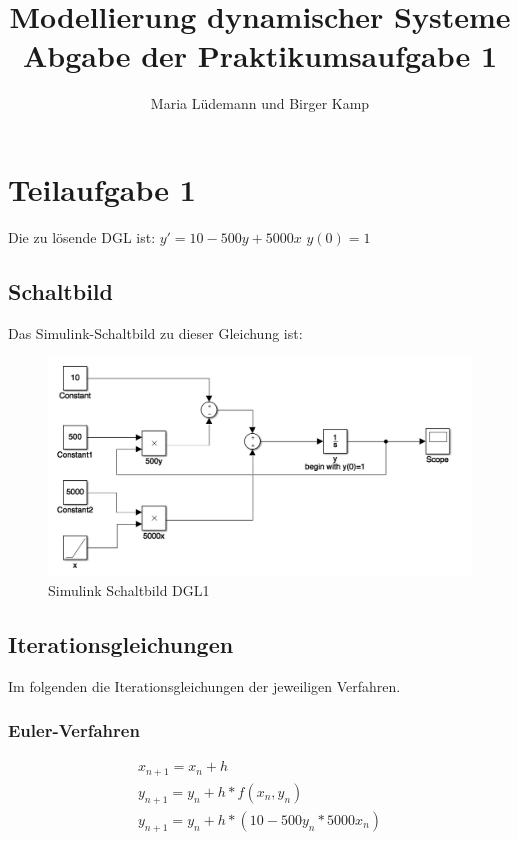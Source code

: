 \documentclass[]{scrartcl}
\title{Modellierung dynamischer Systeme  \\ Abgabe der Praktikumsaufgabe 1}
\author{Maria Lüdemann und Birger Kamp}
\begin{document}
\maketitle

\begin{abstract}

\end{abstract}

\section*{Teilaufgabe 1}
Die zu lösende DGL ist:
$ y' = 10 - 500y + 5000x $
$ y(0) = 1 $

\subsection*{Schaltbild}
Das Simulink-Schaltbild zu dieser Gleichung ist:

\begin{figure}[htbp]
\centering
\includegraphics[width=0.7\linewidth]{A1_1_Schaltbild}
\caption{Simulink Schaltbild DGL1}
\label{fig:A1_1_Schaltbild}
\end{figure}

\subsection*{Iterationsgleichungen}
Im folgenden die Iterationsgleichungen der jeweiligen Verfahren.

\subsubsection*{Euler-Verfahren}
\begin{align}
x_{n+1} = x_{n}+h \\
y_{n+1} = y_{n}+h*f(x_{n},y_{n}) \\
y_{n+1} = y_{n}+h*(10-500y_{n}*5000x_{n})
\end{align}
\end{document}

